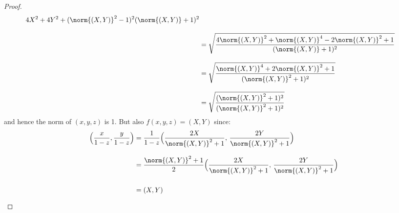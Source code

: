 \documentclass{book}                                                           %
\begin{document}
\begin{proof}
\begin{subequations}
\begin{align}
{{                                        4X^{2}+4Y^{2}+(\norm{(X,Y)}^{2}-1)^{2}%
                                    }{%
                                        (\norm{(X,Y)}+1)^{2}%
                                    }
                                }\\[2ex]
                                &=\sqrt{%
                                \frac{%
                                    4\norm{(X,Y)}^{2}+
                                    \norm{(X,Y)}^{4}-
                                    2\norm{(X,Y)}^{2}+1%
                                }{%
                                    (\norm{(X,Y)}+1)^{2}%
                                }%
                            }\\[2ex]
                            &=\sqrt{%
                                \frac{%
                                    \norm{(X,Y)}^{4}+2\norm{(X,Y)}^{2}+1%
                                }{%
                                    (\norm{(X,Y)}^{2}+1)^{2}%
                                }%
                            }\\[2ex]
                            &=\sqrt{%
                                \frac{(\norm{(X,Y)}^{2}+1)^{2}}
                                     {(\norm{(X,Y)}^{2}+1)^{2}}%
                            }
                        \end{align}
                    \end{subequations}
                    and hence the norm of $(x,y,z)$ is 1. But also
                    $f(x,y,z)=(X,Y)$ since:
                    \begin{subequations}
                        \begin{align}
                            \Big(\frac{x}{1-z},\frac{y}{1-z}\Big)
                                &=\frac{1}{1-z}\Big(%
                                    \frac{2X}{\norm{(X,Y)}^{2}+1},\,
                                    \frac{2Y}{\norm{(X,Y)}^{2}+1}%
                                \Big)\\[2ex]
                            &=\frac{\norm{(X,Y)}^{2}+1}{2}
                                \Big(%
                                    \frac{2X}{\norm{(X,Y)}^{2}+1},\,
                                    \frac{2Y}{\norm{(X,Y)}^{2}+1}%
                                \Big)\\[2ex]
                            &=(X,Y)\vphantom{\Big(\frac{X}{Y})}
                        \end{align}
                    \end{subequations}

\end{proof}
\end{document}
